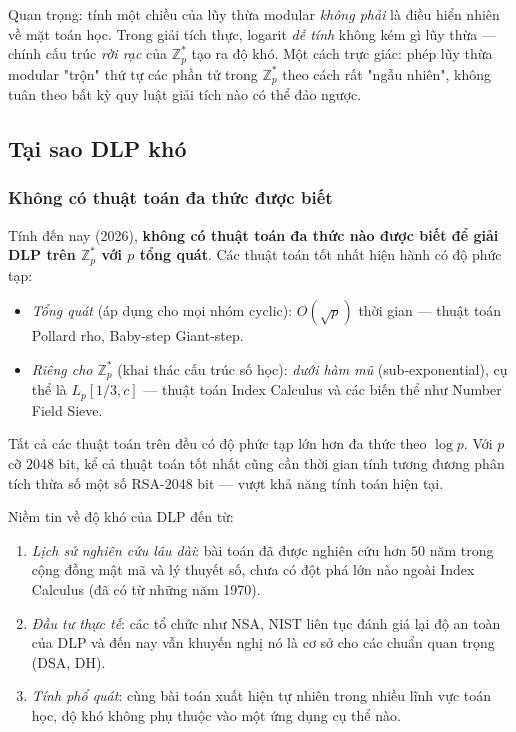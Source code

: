 \documentclass[12pt,a4paper]{report}
\theoremstyle{definition}
\theoremstyle{remark}
\begin{document}
Quan trọng: tính một chiều của lũy thừa modular \emph{không phải} là điều hiển nhiên về mặt toán học. Trong giải tích thực, logarit \emph{dễ tính} không kém gì lũy thừa --- chính cấu trúc \emph{rời rạc} của $\mathbb{Z}_p^*$ tạo ra độ khó. Một cách trực giác: phép lũy thừa modular "trộn" thứ tự các phần tử trong $\mathbb{Z}_p^*$ theo cách rất "ngẫu nhiên", không tuân theo bất kỳ quy luật giải tích nào có thể đảo ngược.

\subsection{Tại sao DLP khó}
\label{subsec:dlp-hardness}

\subsubsection{Không có thuật toán đa thức được biết}

Tính đến nay (2026), \textbf{không có thuật toán đa thức nào được biết để giải DLP trên $\mathbb{Z}_p^*$ với $p$ tổng quát}. Các thuật toán tốt nhất hiện hành có độ phức tạp:
\begin{itemize}[leftmargin=*]
    \item \emph{Tổng quát} (áp dụng cho mọi nhóm cyclic): $O(\sqrt{p})$ thời gian --- thuật toán Pollard rho, Baby-step Giant-step.
    \item \emph{Riêng cho $\mathbb{Z}_p^*$} (khai thác cấu trúc số học): \emph{dưới hàm mũ} (sub-exponential), cụ thể là $L_p[1/3, c]$ --- thuật toán Index Calculus và các biến thể như Number Field Sieve.
\end{itemize}
Tất cả các thuật toán trên đều có độ phức tạp lớn hơn đa thức theo $\log p$. Với $p$ cỡ $2048$ bit, kể cả thuật toán tốt nhất cũng cần thời gian tính tương đương phân tích thừa số một số RSA-$2048$ bit --- vượt khả năng tính toán hiện tại.

Niềm tin về độ khó của DLP đến từ:
\begin{enumerate}[leftmargin=*]
    \item \emph{Lịch sử nghiên cứu lâu dài}: bài toán đã được nghiên cứu hơn $50$ năm trong cộng đồng mật mã và lý thuyết số, chưa có đột phá lớn nào ngoài Index Calculus (đã có từ những năm 1970).
    \item \emph{Đầu tư thực tế}: các tổ chức như NSA, NIST liên tục đánh giá lại độ an toàn của DLP và đến nay vẫn khuyến nghị nó là cơ sở cho các chuẩn quan trọng (DSA, DH).
    \item \emph{Tính phổ quát}: cùng bài toán xuất hiện tự nhiên trong nhiều lĩnh vực toán học, độ khó không phụ thuộc vào một ứng dụng cụ thể nào.
\end{enumerate}
\end{document}

